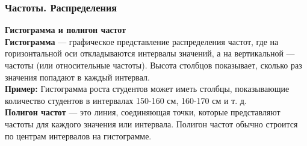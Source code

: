 \documentclass[aspectratio=169]{beamer}
\begin{document}
\begin{frame}
\frametitle{Частоты. Распределения}
\textbf{Гистограмма и полигон частот}
\newline\\
\textbf{Гистограмма} — графическое представление распределения частот, где на горизонтальной оси откладываются интервалы значений, а на вертикальной — частоты (или относительные частоты). Высота столбцов показывает, сколько раз значения попадают в каждый интервал.
\newline\\
\textbf{Пример:} Гистограмма роста студентов может иметь столбцы, показывающие количество студентов в интервалах 150-160 см, 160-170 см и т. д.
\newline\\
\textbf{Полигон частот} — это линия, соединяющая точки, которые представляют частоты для каждого значения или интервала. Полигон частот обычно строится по центрам интервалов на гистограмме.
\end{frame}
\end{document}
